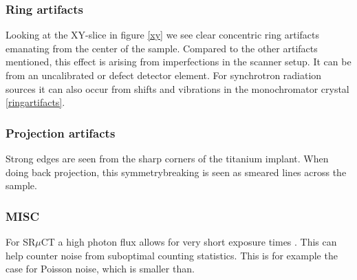 
\subsubsection{Ring artifacts}

Looking at the XY-slice in figure \cref{xy} we see clear concentric ring artifacts emanating from the center of the sample.
Compared to the other artifacts mentioned, this effect is arising from imperfections in the scanner setup. It can be from an uncalibrated or defect detector element. For synchrotron radiation sources it can also occur from shifts and vibrations in the monochromator crystal \cref{ringartifacts}. 


\subsubsection{Projection artifacts}

Strong edges are seen from the sharp corners of the titanium implant. When doing back projection, this symmetrybreaking is seen as smeared lines across the sample.

\subsubsection{MISC}



For SR$\mu$CT a high photon flux allows for very short exposure times \citep{srexptime}.
This can help counter noise from suboptimal counting statistics\citep{srnoise}.
This is for example the case for Poisson noise, which is smaller than.







